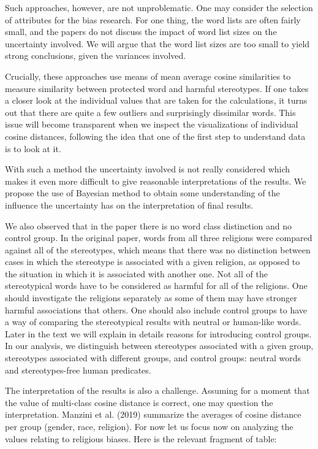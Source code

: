 \documentclass[
  10pt,
  dvipsnames,enabledeprecatedfontcommands, twocolumn]{scrartcl}
\begin{document}
Such approaches, however, are not unproblematic. One may consider the
selection of attributes for the bias research. For one thing, the word
lists are often fairly small, and the papers do not discuss the impact
of word list sizes on the uncertainty involved. We will argue that the
word list sizes are too small to yield strong conclusions, given the
variances involved.

Crucially, these approaches use means of mean average cosine
similarities to measure similarity between protected word and harmful
stereotypes. If one takes a closer look at the individual values that
are taken for the calculations, it turns out that there are quite a few
outliers and surprisingly dissimilar words. This issue will become
transparent when we inspect the visualizations of individual cosine
distances, following the idea that one of the first step to understand
data is to look at it.

With such a method the uncertainty involved is not really considered
which makes it even more difficult to give reasonable interpretations of
the results. We propose the use of Bayesian method to obtain some
understanding of the influence the uncertainty has on the interpretation
of final results.

We also observed that in the paper there is no word class distinction
and no control group. In the original paper, words from all three
religions were compared against all of the stereotypes, which means that
there was no distinction between cases in which the stereotype is
associated with a given religion, as opposed to the situation in which
it is associated with another one. Not all of the stereotypical words
have to be considered as harmful for all of the religions. One should
investigate the religions separately as some of them may have stronger
harmful associations that others. One should also include control groups
to have a way of comparing the stereotypical results with neutral or
human-like words. Later in the text we will explain in details reasons
for introducing control groups. In our analysis, we distinguish between
stereotypes associated with a given group, stereotypes associated with
different groups, and control groups: neutral words and stereotypes-free
human predicates.

The interpretation of the results is also a challenge. Assuming for a
moment that the value of multi-class cosine distance is correct, one may
question the interpretation. Manzini et al. (2019) summarize the
averages of cosine distance per group (gender, race, religion). For now
let us focus now on analyzing the values relating to religious biases.
Here is the relevant fragment of table:
\end{document}
